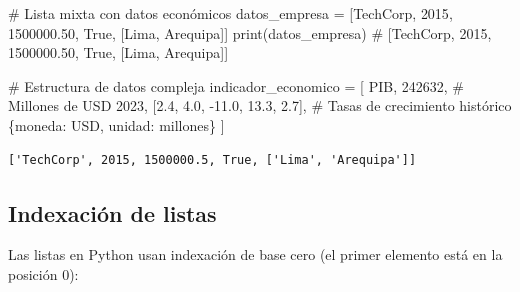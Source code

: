 \documentclass[
  doc,
  floatsintext,
  longtable,
  a4paper,
  nolmodern,
  notxfonts,
  notimes,
  12pt,
  colorlinks=true,linkcolor=blue,citecolor=blue,urlcolor=blue]{apa7}
\newenvironment{Shaded}{\begin{snugshade}}{\end{snugshade}}
\newcommand{\BuiltInTok}[1]{\textcolor[rgb]{0.00,0.23,0.31}{#1}}
\newcommand{\CommentTok}[1]{\textcolor[rgb]{0.37,0.37,0.37}{#1}}
\newcommand{\DecValTok}[1]{\textcolor[rgb]{0.68,0.00,0.00}{#1}}
\newcommand{\FloatTok}[1]{\textcolor[rgb]{0.68,0.00,0.00}{#1}}
\newcommand{\NormalTok}[1]{\textcolor[rgb]{0.00,0.23,0.31}{#1}}
\newcommand{\OperatorTok}[1]{\textcolor[rgb]{0.37,0.37,0.37}{#1}}
\newcommand{\StringTok}[1]{\textcolor[rgb]{0.13,0.47,0.30}{#1}}
\newcommand{\VariableTok}[1]{\textcolor[rgb]{0.07,0.07,0.07}{#1}}
\begin{document}
\begin{Shaded}
\begin{Highlighting}[]
\CommentTok{\# Lista mixta con datos económicos}
\NormalTok{datos\_empresa }\OperatorTok{=}\NormalTok{ [}\StringTok{\textquotesingle{}TechCorp\textquotesingle{}}\NormalTok{, }\DecValTok{2015}\NormalTok{, }\FloatTok{1500000.50}\NormalTok{, }\VariableTok{True}\NormalTok{, [}\StringTok{\textquotesingle{}Lima\textquotesingle{}}\NormalTok{, }\StringTok{\textquotesingle{}Arequipa\textquotesingle{}}\NormalTok{]]}
\BuiltInTok{print}\NormalTok{(datos\_empresa)}
\CommentTok{\# [\textquotesingle{}TechCorp\textquotesingle{}, 2015, 1500000.50, True, [\textquotesingle{}Lima\textquotesingle{}, \textquotesingle{}Arequipa\textquotesingle{}]]}

\CommentTok{\# Estructura de datos compleja}
\NormalTok{indicador\_economico }\OperatorTok{=}\NormalTok{ [}
    \StringTok{\textquotesingle{}PIB\textquotesingle{}}\NormalTok{,}
    \DecValTok{242632}\NormalTok{,  }\CommentTok{\# Millones de USD}
    \DecValTok{2023}\NormalTok{,}
\NormalTok{    [}\FloatTok{2.4}\NormalTok{, }\FloatTok{4.0}\NormalTok{, }\OperatorTok{{-}}\FloatTok{11.0}\NormalTok{, }\FloatTok{13.3}\NormalTok{, }\FloatTok{2.7}\NormalTok{],  }\CommentTok{\# Tasas de crecimiento histórico}
\NormalTok{    \{}\StringTok{\textquotesingle{}moneda\textquotesingle{}}\NormalTok{: }\StringTok{\textquotesingle{}USD\textquotesingle{}}\NormalTok{, }\StringTok{\textquotesingle{}unidad\textquotesingle{}}\NormalTok{: }\StringTok{\textquotesingle{}millones\textquotesingle{}}\NormalTok{\}}
\NormalTok{]}
\end{Highlighting}
\end{Shaded}

\begin{verbatim}
['TechCorp', 2015, 1500000.5, True, ['Lima', 'Arequipa']]
\end{verbatim}

\subsection{Indexación de listas}\label{indexaciuxf3n-de-listas}

Las listas en Python usan indexación de base cero (el primer elemento
está en la posición 0):
\end{document}
